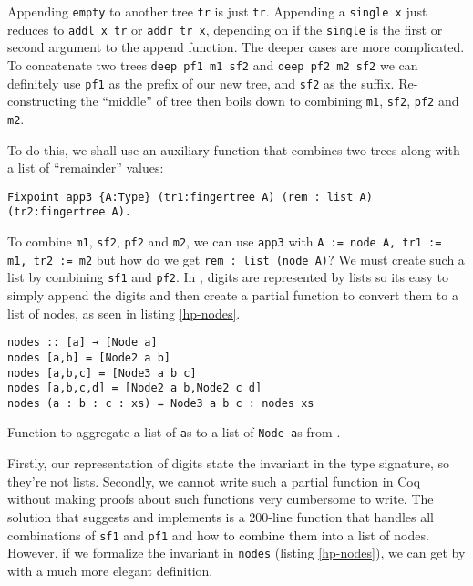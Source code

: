 \documentclass{article}
\newcommand{\code}[1]{\texttt{#1}}
\begin{document}
Appending \code{empty} to another tree \code{tr} is just \code{tr}.
Appending a \code{single x} just reduces to \code{addl x tr} or \code{addr tr x},
depending on if the \code{single} is the first or second argument to the
append function. The deeper cases are more complicated. To concatenate two
trees \code{deep pf1 m1 sf2} and \code{deep pf2 m2 sf2} we can definitely
use \code{pf1} as the prefix of our new tree, and \code{sf2} as the suffix.
Re-constructing the ``middle'' of tree then boils down to combining
\code{m1}, \code{sf2}, \code{pf2} and \code{m2}.

To do this, we shall use an auxiliary function that combines two trees along
with a list of ``remainder'' values:

\begin{verbatim}
Fixpoint app3 {A:Type} (tr1:fingertree A) (rem : list A) (tr2:fingertree A).
\end{verbatim}

To combine \code{m1}, \code{sf2}, \code{pf2} and \code{m2}, we can use
\code{app3} with \code{A := node A, tr1 := m1, tr2 := m2} but how do we
get \code{rem : list (node A)}? We must create such a list by combining
\code{sf1} and \code{pf2}. In \cite{Hinze-Paterson:FingerTree}, digits are
represented by lists so its easy to simply append the digits and then
create a partial function to convert them to a list of nodes, as seen in
listing \ref{hp-nodes}.

\begin{listing}[H]
\begin{verbatim}
nodes :: [a] → [Node a]
nodes [a,b] = [Node2 a b]
nodes [a,b,c] = [Node3 a b c]
nodes [a,b,c,d] = [Node2 a b,Node2 c d]
nodes (a : b : c : xs) = Node3 a b c : nodes xs
\end{verbatim}
\caption{Function to aggregate a list of \code{a}s to a list of \code{Node a}s
        from \cite{Hinze-Paterson:FingerTree}.}
\label{hp-nodes}
\end{listing}

Firstly, our representation of digits state the invariant in the type signature,
so they're not lists. Secondly, we cannot write such a partial function in Coq
without making proofs about such functions very cumbersome to write. The solution
that \cite{Hinze-Paterson:FingerTree} suggests and \cite{fingertrees-coq} implements
is a 200-line function that handles all combinations of \code{sf1} and \code{pf1}
and how to combine them into a list of nodes. However, if we formalize the
invariant in \code{nodes} (listing \ref{hp-nodes}), we can get by with a much
more elegant definition.
\end{document}
